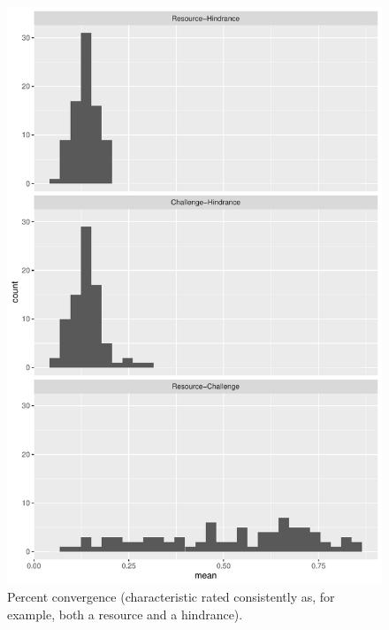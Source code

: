 \documentclass[
  jou]{apa6}
\begin{document}
\begin{figure}
\centering
\includegraphics{SIOP2024convergence_files/figure-latex/percagree-1.pdf}
\caption{\label{fig:percagree}Percent convergence (characteristic rated consistently as, for example, both a resource and a hindrance).}
\end{figure}
\end{document}

